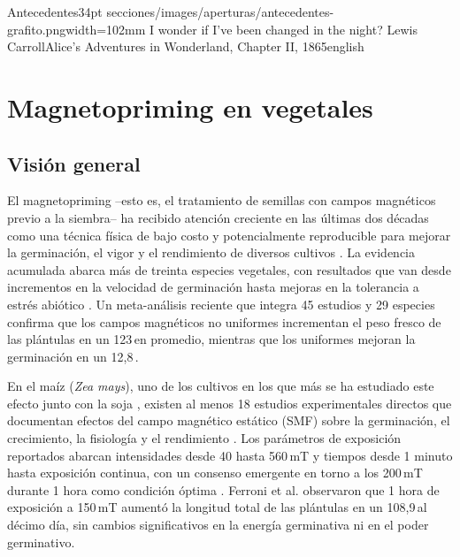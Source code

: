 
\aperturacapitulo
  {Antecedentes}{34pt}
  {secciones/images/aperturas/antecedentes-grafito.png}{width=102mm}
  {I wonder if I've been changed in the night?}
  {Lewis Carroll}{Alice's Adventures in Wonderland, Chapter II, 1865}{english}
\label{cap:antecedentes}

\section{Magnetopriming en vegetales}

\subsection{Visión general}

El magnetopriming --esto es, el tratamiento de semillas con campos magnéticos previo a la siembra-- ha recibido atención creciente en las últimas dos décadas como una técnica física de bajo costo y potencialmente reproducible para mejorar la germinación, el vigor y el rendimiento de diversos cultivos \cite{araujo_2016, sarraf_2020}. La evidencia acumulada abarca más de treinta especies vegetales, con resultados que van desde incrementos en la velocidad de germinación hasta mejoras en la tolerancia a estrés abiótico \cite{radhakrishnan_2019, farooq_2019}. Un meta-análisis reciente que integra 45 estudios y 29 especies confirma que los campos magnéticos no uniformes incrementan el peso fresco de las plántulas en un 123\,\pct en promedio, mientras que los uniformes mejoran la germinación en un 12,8\,\pct \cite{tapia_belmonte_2023}.

En el maíz (\textit{Zea mays}), uno de los cultivos en los que más se ha estudiado este efecto junto con la soja \cite{tapia_belmonte_2023}, existen al menos 18 estudios experimentales directos que documentan efectos del campo magnético estático (SMF) sobre la germinación, el crecimiento, la fisiología y el rendimiento \cite{aladjadjiyan_2002, florez_2007, vashisth_joshi_2017, ferroni_2024}. Los parámetros de exposición reportados abarcan intensidades desde 40 hasta 560\,mT y tiempos desde 1 minuto hasta exposición continua, con un consenso emergente en torno a los 200\,mT durante 1 hora como condición óptima \cite{shine_guruprasad_2012, vashisth_joshi_2017, kataria_2017}. Ferroni et al. \cite{ferroni_2024} observaron que 1 hora de exposición a 150\,mT aumentó la longitud total de las plántulas en un 108,9\,\pct al décimo día, sin cambios significativos en la energía germinativa ni en el poder germinativo.

